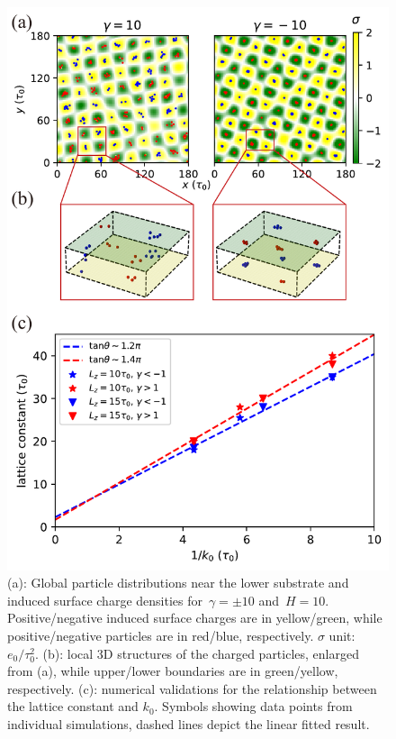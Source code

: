 \begin{figure}
	\centering
	\includegraphics[width=1\textwidth]{figs/fig4.pdf}
	\caption{\label{fig:MD} 
        (a): Global particle distributions near the lower substrate and induced surface charge densities for~$\gamma = \pm 10$ and~$H = 10$. 
        Positive/negative induced surface charges are in yellow/green, while positive/negative particles are in red/blue, respectively.
        $\sigma$ unit:~$e_0/\tau_0^2$.
        (b): local 3D structures of the charged particles, enlarged from (a), while upper/lower boundaries are in green/yellow, respectively.
        (c): numerical validations for the relationship between the lattice constant and $k_0$. Symbols showing data points from individual simulations, dashed lines depict the linear fitted result.}
\end{figure}

